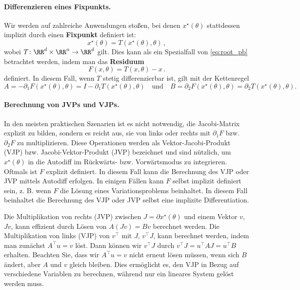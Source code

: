\paragraph{Differenzieren eines Fixpunkts.}

Wir werden auf zahlreiche Anwendungen stoßen, bei denen $x^\star(\theta)$ stattdessen implizit durch einen \textbf{Fixpunkt} definiert ist:
\begin{equation}
    x^\star(\theta) = T(x^\star(\theta), \theta)\,,
\end{equation}
wobei $T \colon \RR^d \times \RR^n \to \RR^d$ gilt.
Dies kann als ein Spezialfall von \eqref{eq:root_pb} betrachtet werden, indem man das \textbf{Residuum}
\begin{equation}
F(x, \theta) = T(x, \theta) - x\,.
\label{eq:fixed_point_to_root}
\end{equation}
definiert. In diesem Fall, wenn $T$ stetig differenzierbar ist, gilt mit der Kettenregel
\begin{equation}
A = -\partial_1 F(x^\star(\theta), \theta) = 
I -\partial_1 T(x^\star(\theta), \theta)
\quad \text{und} \quad
B = \partial_2 F(x^\star(\theta), \theta) = 
\partial_2 T(x^\star(\theta), \theta).
\end{equation}

\paragraph{Berechnung von JVPs und VJPs.}

In den meisten praktischen Szenarien ist es nicht notwendig, die Jacobi-Matrix explizit zu bilden, sondern es reicht aus, sie von links oder rechts mit $\partial_1 F$ bzw. $\partial_2 F$ zu multiplizieren. Diese Operationen werden als Vektor-Jacobi-Produkt (VJP) bzw. Jacobi-Vektor-Produkt (JVP) bezeichnet und sind nützlich, um $x^\star(\theta)$ in die Autodiff im Rückwärts- bzw. Vorwärtsmodus zu integrieren.
Oftmals ist $F$ explizit definiert. In diesem Fall kann die Berechnung des VJP oder JVP mittels Autodiff erfolgen. 
In einigen Fällen kann $F$ selbst implizit definiert sein, z. B. wenn $F$ die Lösung eines Variationsproblems beinhaltet. In diesem Fall beinhaltet die Berechnung des VJP oder JVP selbst eine implizite Differentiation.

Die Multiplikation von rechts (JVP) zwischen $J = \partial x^\star(\theta)$ und einem Vektor $v$, $Jv$, kann effizient durch Lösen von $A (Jv) = Bv$ berechnet werden. 
Die Multiplikation von links (VJP) von $v^\top$ mit $J$, $v^\top J$, kann berechnet werden, indem man zunächst $A^\top u = v$ löst. Dann können wir $v^\top J$ durch $v^\top J = u^\top A J = u^\top B$ erhalten. 
Beachten Sie, dass wir $A^\top u = v$ nicht erneut lösen müssen, wenn sich $B$ ändert, aber $A$ und $v$ gleich bleiben. Dies ermöglicht es, den VJP in Bezug auf verschiedene Variablen zu berechnen, während nur ein lineares System gelöst werden muss.

